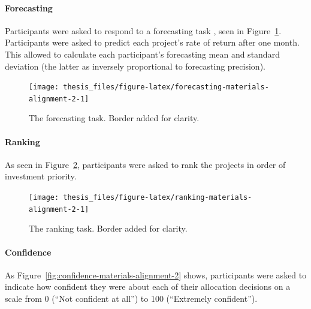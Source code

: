 \documentclass[a4paper, nobind, dvipsnames]{templates/ociamthesis}
\theoremstyle{definition}
\theoremstyle{definition}
\theoremstyle{definition}
\theoremstyle{definition}
\theoremstyle{remark}
\begin{document}
\hypertarget{forecasting-materials-alignment-2}{%
\paragraph{Forecasting}\label{forecasting-materials-alignment-2}}

Participants were asked to respond to a forecasting task \autocite[adapted from][]{long2018}, seen in Figure~\ref{fig:forecasting-materials-alignment-2}.
Participants were asked to predict each project's rate of return after one
month. This allowed to calculate each participant's forecasting mean and
standard deviation (the latter as inversely proportional to forecasting
precision).



\begin{figure}
\texttt{[image: thesis\_files/figure-latex/forecasting-materials-alignment-2-1]} \caption{The forecasting task. Border added for clarity.}\label{fig:forecasting-materials-alignment-2}
\end{figure}

\hypertarget{ranking-materials-alignment-2}{%
\paragraph{Ranking}\label{ranking-materials-alignment-2}}

As seen in Figure~\ref{fig:ranking-materials-alignment-2}, participants were
asked to rank the projects in order of investment priority.



\begin{figure}
\texttt{[image: thesis\_files/figure-latex/ranking-materials-alignment-2-1]} \caption{The ranking task. Border added for clarity.}\label{fig:ranking-materials-alignment-2}
\end{figure}

\hypertarget{confidence-materials-alignment-2}{%
\paragraph{Confidence}\label{confidence-materials-alignment-2}}

As Figure~\ref{fig:confidence-materials-alignment-2} shows, participants were
asked to indicate how confident they were about each of their allocation
decisions on a scale from 0 (``Not confident at all'') to 100 (``Extremely
confident'').
\end{document}
